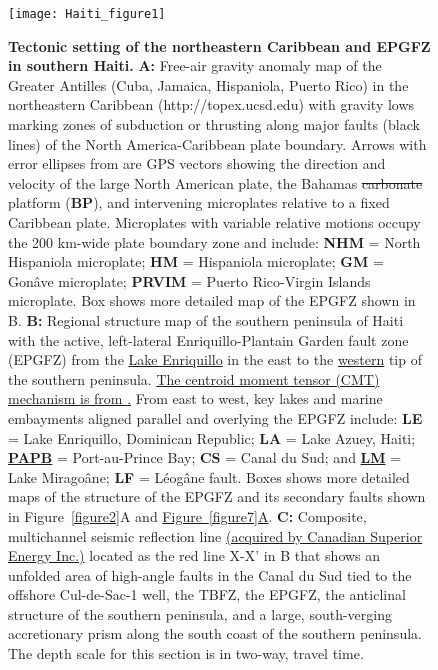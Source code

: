 \documentclass[linenumbers,draft]{agujournal}
\begin{document}
\clearpage



\begin{figure}
\centering
\texttt{[image: Haiti\_figure1]}
\caption{\textbf{Tectonic setting of the northeastern Caribbean and EPGFZ in southern Haiti.} \textbf{A:}
Free-air gravity anomaly map of the Greater Antilles (Cuba, Jamaica, Hispaniola, Puerto Rico) in the northeastern Caribbean (http://topex.ucsd.edu) with gravity lows marking zones of subduction or thrusting along major faults (black lines) of the North America-Caribbean plate boundary. Arrows with error ellipses from \citet{calais2010transpressional} are GPS vectors showing the direction and velocity of the large North American plate, the Bahamas \st{carbonate} platform (\textbf{BP}), and intervening microplates relative to a fixed Caribbean plate. Microplates with variable relative motions occupy the 200 km-wide plate boundary zone and include: \textbf{NHM} = North Hispaniola microplate; \textbf{HM} = Hispaniola microplate; \textbf{GM} = Gon\^ave microplate; \textbf{PRVIM} = Puerto Rico-Virgin Islands microplate. Box shows more detailed map of the EPGFZ shown in B. \textbf{B:} Regional structure map of the southern peninsula of Haiti with the active, left-lateral Enriquillo-Plantain Garden fault zone (EPGFZ) from the \underline{Lake Enriquillo} in the east to the \ul{western} tip of the southern peninsula. \underline{The centroid moment tensor (CMT) mechanism is from \citet{douilly2013crustal}.} From east to west, key lakes and marine embayments aligned parallel and overlying the EPGFZ include: \textbf{LE} = Lake Enriquillo, Dominican Republic; \textbf{LA} = Lake Azuey, Haiti; \textbf{\ul{PAPB}} = Port-au-Prince Bay; \textbf{CS }= Canal du Sud; and \textbf{\ul{LM}} = Lake Mirago\^ane; \textbf{LF} = L\'eog\^ane fault. Boxes shows more detailed maps of the structure of the EPGFZ and its secondary faults shown in Figure~\ref{figure2}A and \underline{Figure~\ref{figure7}A}. \textbf{C:} Composite, multichannel seismic reflection line \ul{(acquired by Canadian Superior Energy Inc.)} located as the red line X-X' in B that shows an unfolded area of high-angle faults in the Canal du Sud tied to the offshore Cul-de-Sac-1 well, the TBFZ, the EPGFZ, the anticlinal structure of the southern peninsula, and a large, south-verging accretionary prism along the south coast of the southern peninsula. The depth scale for this section is in two-way, travel time.}
\label{figure1}
\end{figure}
\end{document}
